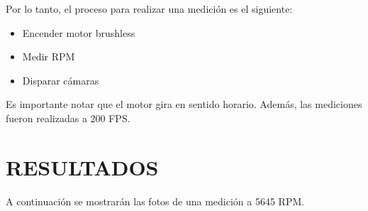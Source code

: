 \documentclass{article}
\begin{document}
\noindent Por lo tanto, el proceso para realizar una medición es el siguiente:

\begin{itemize}
    \item Encender motor brushless
    \item Medir RPM
    \item Disparar cámaras
\end{itemize}

\noindent Es importante notar que el motor gira en sentido horario. Además, las mediciones fueron realizadas a 200 FPS.

\newpage
\section{RESULTADOS}

\noindent A continuación se mostrarán las fotos de una medición a 5645 RPM.
\end{document}
